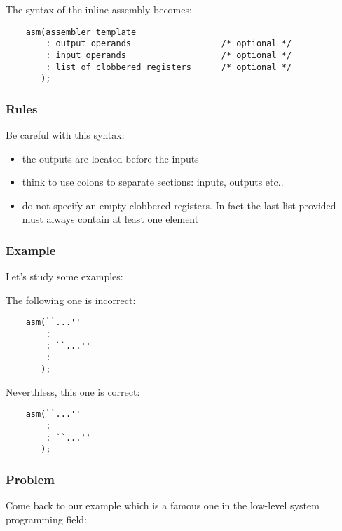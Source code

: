 {\begin{frame}[containsverbatim]
  \nl

  The syntax of the inline assembly becomes:

  \begin{verbatim}
    asm(assembler template
        : output operands                  /* optional */
        : input operands                   /* optional */
        : list of clobbered registers      /* optional */
       );
  \end{verbatim}
\end{frame}


\begin{frame}
  \frametitle{Rules}

  Be careful with this syntax:

  \begin{itemize}[<+->]
    \item
      the outputs are located before the inputs
    \item
      think to use colons to separate sections: inputs, outputs etc..
    \item
      do not specify an empty clobbered registers. In fact the
      last list provided must always contain at least one element
  \end{itemize}
\end{frame}


\begin{frame}[containsverbatim]
  \frametitle{Example}

  Let's study some examples:

  \nl

  The following one is \alert{incorrect}:

  \begin{verbatim}
    asm(``...''
        :
        : ``...''
        :
       );
  \end{verbatim}

  Neverthless, this one is correct:

  \begin{verbatim}
    asm(``...''
        :
        : ``...''
       );
  \end{verbatim}
\end{frame}


\begin{frame}[containsverbatim]
  \frametitle{Problem}

  Come back to our example which is a famous one in the low-level system
  programming field:


\end{frame}}
